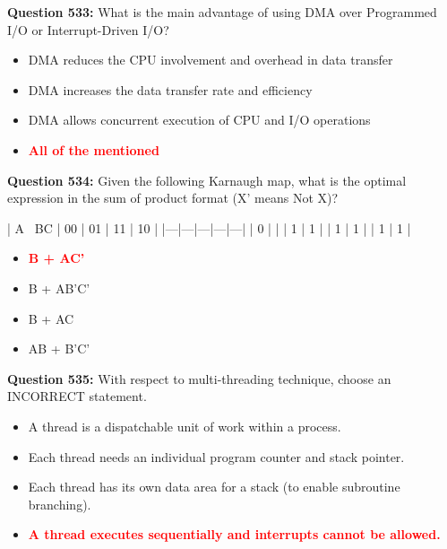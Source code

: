 \documentclass[12pt,a4paper]{article}
\begin{document}
\textbf{Question 533:} What is the main advantage of using DMA over Programmed I/O or Interrupt-Driven I/O?

\begin{itemize}
    \item[\textbf{A.}] DMA reduces the CPU involvement and overhead in data transfer
    \item[\textbf{B.}] DMA increases the data transfer rate and efficiency
    \item[\textbf{C.}] DMA allows concurrent execution of CPU and I/O operations
    \item[\textbf{D.}] \textcolor{red}{\textbf{All of the mentioned}}
\end{itemize}

\vspace{0.5cm}

\textbf{Question 534:} Given the following Karnaugh map, what is the optimal expression in the sum of product format (X' means Not X)?

| A \ BC | 00 | 01 | 11 | 10 |
|---|---|---|---|---|
| 0 | | | 1 | 1 |
| 1 | 1 | | 1 | 1 |

\begin{itemize}
    \item[\textbf{A.}] \textcolor{red}{\textbf{B + AC'}}
    \item[\textbf{B.}] B + AB'C'
    \item[\textbf{C.}] B + AC
    \item[\textbf{D.}] AB + B'C'
\end{itemize}

\vspace{0.5cm}

\textbf{Question 535:} With respect to multi-threading technique, choose an INCORRECT statement.

\begin{itemize}
    \item[\textbf{A.}] A thread is a dispatchable unit of work within a process.
    \item[\textbf{B.}] Each thread needs an individual program counter and stack pointer.
    \item[\textbf{C.}] Each thread has its own data area for a stack (to enable subroutine branching).
    \item[\textbf{D.}] \textcolor{red}{\textbf{A thread executes sequentially and interrupts cannot be allowed.}}
\end{itemize}

\vspace{0.5cm}
\end{document}
